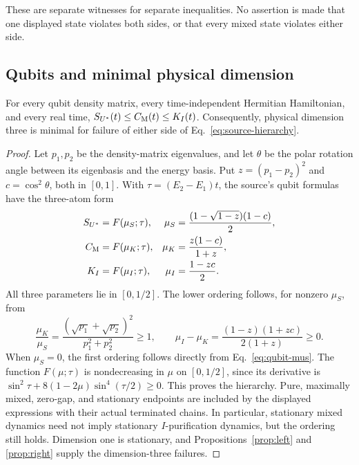 These are separate witnesses for separate inequalities. No assertion is
made that one displayed state violates both sides, or that every mixed state
violates either side.

\subsection{Qubits and minimal physical dimension}
\begin{theorem}\label{thm:qubit}
For every qubit density matrix, every time-independent Hermitian Hamiltonian,
and every real time, $S_{U^*}(t)\le C_{\mathrm M}(t)\le K_I(t)$. Consequently, physical
dimension three is minimal for failure of either side of
Eq.~\eqref{eq:source-hierarchy}.
\end{theorem}
\begin{proof}
Let $p_1,p_2$ be the density-matrix eigenvalues, and let $\theta$ be the
polar rotation angle between its eigenbasis and the energy basis. Put
$z=(p_1-p_2)^2$ and $c=\cos^2\theta$, both in $[0,1]$. With
$\tau=(E_2-E_1)t$, the source's qubit formulas
\cite[Eq.~(18), Supplemental Eqs.~(S.24)--(S.31)]{DasMori2026} have the
three-atom form
\begin{equation}\label{eq:qubit-mus}
 \begin{aligned}
 S_{U^*}&=F(\mu_S;\tau),&\mu_S&=\frac{(1-\sqrt{1-z})(1-c)}2,\\
 C_{\mathrm M}&=F(\mu_K;\tau),&\mu_K&=\frac{z(1-c)}{1+z},\\
 K_I&=F(\mu_I;\tau),&\mu_I&=\frac{1-zc}{2}.
 \end{aligned}
\end{equation}
All three parameters lie in $[0,1/2]$. The lower ordering follows, for
nonzero $\mu_S$, from
\begin{equation}\label{eq:qubit-order}
 \frac{\mu_K}{\mu_S}
 =\frac{(\sqrt{p_1}+\sqrt{p_2})^2}{p_1^2+p_2^2}\ge1,
 \qquad
 \mu_I-\mu_K=\frac{(1-z)(1+zc)}{2(1+z)}\ge0.
\end{equation}
When $\mu_S=0$, the first ordering follows directly from
Eq.~\eqref{eq:qubit-mus}. The function $F(\mu;\tau)$ is nondecreasing in
$\mu$ on $[0,1/2]$, since its derivative is
$\sin^2\tau+8(1-2\mu)\sin^4(\tau/2)\ge0$.
This proves the hierarchy. Pure, maximally mixed, zero-gap, and stationary
endpoints are included by the displayed expressions with their actual
terminated chains. In particular, stationary mixed dynamics need not imply
stationary $I$-purification dynamics, but the ordering still holds.
Dimension one is stationary, and Propositions~\ref{prop:left} and
\ref{prop:right} supply the dimension-three failures.
\end{proof}

